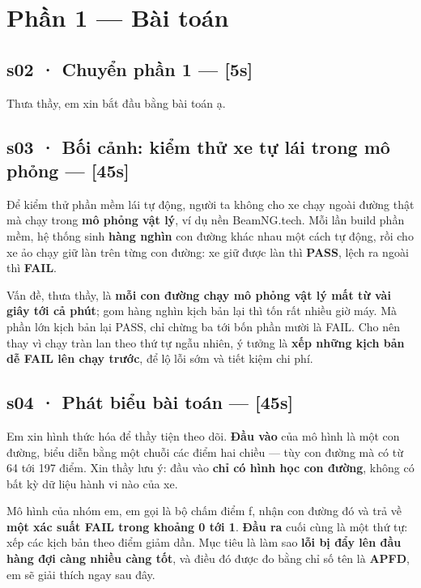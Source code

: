 \documentclass[
  11pt,
]{article}
\begin{document}
\section{Phần 1 --- Bài toán}\label{phux1ea7n-1-buxe0i-touxe1n}

\subsection{s02 · Chuyển phần 1 ---
{[}5s{]}}\label{s02-chuyux1ec3n-phux1ea7n-1-5s}

Thưa thầy, em xin bắt đầu bằng bài toán ạ.

\subsection{s03 · Bối cảnh: kiểm thử xe tự lái trong mô phỏng ---
{[}45s{]}}\label{s03-bux1ed1i-cux1ea3nh-kiux1ec3m-thux1eed-xe-tux1ef1-luxe1i-trong-muxf4-phux1ecfng-45s}

Để kiểm thử phần mềm lái tự động, người ta không cho xe chạy ngoài đường
thật mà chạy trong \textbf{mô phỏng vật lý}, ví dụ nền BeamNG.tech. Mỗi
lần build phần mềm, hệ thống sinh \textbf{hàng nghìn} con đường khác
nhau một cách tự động, rồi cho xe ảo chạy giữ làn trên từng con đường:
xe giữ được làn thì \textbf{PASS}, lệch ra ngoài thì \textbf{FAIL}.

Vấn đề, thưa thầy, là \textbf{mỗi con đường chạy mô phỏng vật lý mất từ
vài giây tới cả phút}; gom hàng nghìn kịch bản lại thì tốn rất nhiều giờ
máy. Mà phần lớn kịch bản lại PASS, chỉ chừng ba tới bốn phần mười là
FAIL. Cho nên thay vì chạy tràn lan theo thứ tự ngẫu nhiên, ý tưởng là
\textbf{xếp những kịch bản dễ FAIL lên chạy trước}, để lộ lỗi sớm và
tiết kiệm chi phí.

\subsection{s04 · Phát biểu bài toán ---
{[}45s{]}}\label{s04-phuxe1t-biux1ec3u-buxe0i-touxe1n-45s}

Em xin hình thức hóa để thầy tiện theo dõi. \textbf{Đầu vào} của mô hình
là một con đường, biểu diễn bằng một chuỗi các điểm hai chiều --- tùy
con đường mà có từ 64 tới 197 điểm. Xin thầy lưu ý: đầu vào \textbf{chỉ
có hình học con đường}, không có bất kỳ dữ liệu hành vi nào của xe.

Mô hình của nhóm em, em gọi là bộ chấm điểm f, nhận con đường đó và trả
về \textbf{một xác suất FAIL trong khoảng 0 tới 1}. \textbf{Đầu ra} cuối
cùng là một thứ tự: xếp các kịch bản theo điểm giảm dần. Mục tiêu là làm
sao \textbf{lỗi bị đẩy lên đầu hàng đợi càng nhiều càng tốt}, và điều đó
được đo bằng chỉ số tên là \textbf{APFD}, em sẽ giải thích ngay sau đây.
\end{document}
